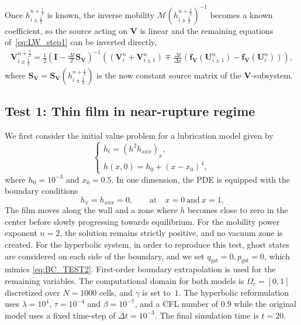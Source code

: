 \documentclass[11pt]{article}
\numberwithin{equation}{section}
\newtheorem{counter example}[theorem]{Counter Example}
\numberwithin{equation}{section}
\numberwithin{equation}{section}
\newcommand{\prn}[1]{\left( #1 \right)}
\newcommand{\hlf}{\frac{1}{2}}
\newcommand{\dt}{\Delta t}
\begin{document}
Once $h_{i\pm\hlf}^{n+\hlf}$ is known, the inverse mobility
$\mathcal{M}\left(h_{i\pm\hlf}^{n+\hlf}\right)^{-1}$ becomes a known coefficient, so the
source acting on $\mathbf{V}$ is linear and the remaining equations
of~\eqref{eq:LW_step1} can be inverted directly,
\begin{align}
	\mathbf{V}_{i\pm\hlf}^{n+\hlf} = \frac{1}{2}\prn{\mathbf I - \frac{\dt}{2}\mathbf{S}_{\mathbf{V}}}^{-1}
	\prn{\prn{\mathbf{V}_{i}^n + \mathbf{V}_{i\pm1}^n}
		\mp \frac{\Delta t}{\Delta x}\prn{\mathbf{f}_{\mathbf{V}}(\mathbf{U}_{i\pm1}^n)-\mathbf{f}_{\mathbf{V}}(\mathbf{U}_{i}^n)}},
\end{align}
where $\mathbf{S}_{\mathbf{V}}=\mathbf{S}_{\mathbf{V}}\left(h_{i\pm\hlf}^{n+\hlf}\right)$ is
the now constant source matrix of the $\mathbf{V}$-subsystem.
\subsection{Test 1: Thin film in near-rupture regime}
\label{ssec:deadcore}
We first consider the initial value problem for a lubrication model \cite{grun2000nonnegativity} given by
\begin{equation*}
	\begin{cases}
		h_t = \prn{h^2 h_{xxx}}_{x},\\[2pt]
		h(x,0) = h_0 + (x - x_0)^4,
	\end{cases}
\end{equation*}
where $h_0=10^{-3}$ and $x_0 = 0.5$. In one dimension, the PDE is equipped with the boundary conditions \cite{grun2000nonnegativity}
\begin{equation}
	h_x = h_{xxx} = 0, \qquad \text{at} \quad x=0 \ \text{and}\  x=1.
	\label{eq:BC_TEST2}
\end{equation}
The film moves along the wall and a zone where $h$ becomes close to zero in the center before slowly progressing towards equilibrium. For the mobility power exponent $n=2$, the solution remains strictly positive, and no vacuum zone is created. 
For the hyperbolic system, in order to reproduce this test, ghost states are considered on each side of the boundary, and we set $q_{\text{gst}} = 0, p_{\text{gst}} = 0$, which mimics \eqref{eq:BC_TEST2}. First-order boundary extrapolation is used for the remaining variables.
The computational domain for both models is $\Omega_c=[0,1]$ discretized over $N=1000$ cells, and $\gamma$ is set to~$1$. The hyperbolic reformulation uses $\lambda=10^{4}$, $\tau=10^{-4}$ and $\beta=10^{-7}$, and a CFL number of $0.9$ while the original model uses a fixed time-step of $\Delta t = 10^{-3}$. The final simulation time is $t=20$.
\end{document}
